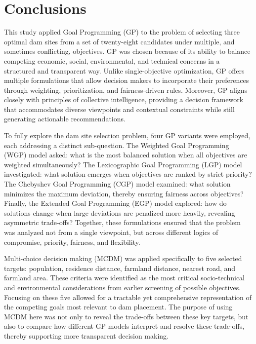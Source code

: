 \section{Conclusions}\label{sec:conclusions}
This study applied Goal Programming (GP) to the problem of selecting three optimal dam sites from a set of twenty-eight candidates under multiple, and sometimes conflicting, objectives. GP was chosen because of its ability to balance competing economic, social, environmental, and technical concerns in a structured and transparent way. Unlike single-objective optimization, GP offers multiple formulations that allow decision makers to incorporate their preferences through weighting, prioritization, and fairness-driven rules. Moreover, GP aligns closely with principles of collective intelligence, providing a decision framework that accommodates diverse viewpoints and contextual constraints while still generating actionable recommendations.  

To fully explore the dam site selection problem, four GP variants were employed, each addressing a distinct sub-question. The Weighted Goal Programming (WGP) model asked: what is the most balanced solution when all objectives are weighted simultaneously? The Lexicographic Goal Programming (LGP) model investigated: what solution emerges when objectives are ranked by strict priority? The Chebyshev Goal Programming (CGP) model examined: what solution minimizes the maximum deviation, thereby ensuring fairness across objectives? Finally, the Extended Goal Programming (EGP) model explored: how do solutions change when large deviations are penalized more heavily, revealing asymmetric trade-offs? Together, these formulations ensured that the problem was analyzed not from a single viewpoint, but across different logics of compromise, priority, fairness, and flexibility.

Multi-choice decision making (MCDM) was applied specifically to five selected targets: population, residence distance, farmland distance, nearest road, and farmland area. These criteria were identified as the most critical socio-technical and environmental considerations from earlier screening of possible objectives. Focusing on these five allowed for a tractable yet comprehensive representation of the competing goals most relevant to dam placement. The purpose of using MCDM here was not only to reveal the trade-offs between these key targets, but also to compare how different GP models interpret and resolve these trade-offs, thereby supporting more transparent decision making.

